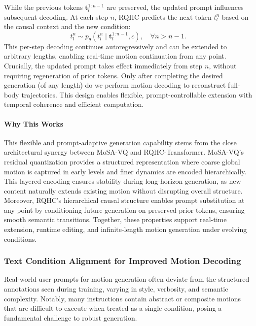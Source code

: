 \documentclass[a4paper,12pt]{article}
\begin{document}
While the previous tokens \( \mathbf{t}_l^{1:n-1} \) are preserved, the updated prompt influences subsequent decoding. At each step \( n \), RQHC predicts the next token \( t_l^n \) based on the causal context and the new condition:
\begin{equation}
t_l^n \sim p_\theta(t_l^n \mid \mathbf{t}_l^{1:n-1}, c), \quad \forall n > n{-}1.
\end{equation}
This per-step decoding continues autoregressively and can be extended to arbitrary lengths, enabling real-time motion continuation from any point. Crucially, the updated prompt takes effect immediately from step \( n \), without requiring regeneration of prior tokens. Only after completing the desired generation (of any length) do we perform motion decoding to reconstruct full-body trajectories. This design enables flexible, prompt-controllable extension with temporal coherence and efficient computation.

\paragraph{Why This Works}
This flexible and prompt-adaptive generation capability stems from the close architectural synergy between MoSA-VQ and RQHC-Transformer. MoSA-VQ’s residual quantization provides a structured representation where coarse global motion is captured in early levels and finer dynamics are encoded hierarchically. This layered encoding ensures stability during long-horizon generation, as new content naturally extends existing motion without disrupting overall structure. Moreover, RQHC’s hierarchical causal structure enables prompt substitution at any point by conditioning future generation on preserved prior tokens, ensuring smooth semantic transitions. Together, these properties support real-time extension, runtime editing, and infinite-length motion generation under evolving conditions.


\subsubsection{Text Condition Alignment for Improved Motion Decoding}

Real-world user prompts for motion generation often deviate from the structured annotations seen during training, varying in style, verbosity, and semantic complexity. Notably, many instructions contain abstract or composite motions that are difficult to execute when treated as a single condition, posing a fundamental challenge to robust generation.
\end{document}
